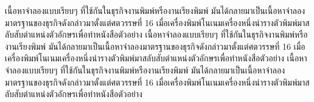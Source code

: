 \begin{thaiabstract}
\setlength{\parskip}{12pt}
\setlength{\parindent}{10mm}
\begin{spacing}{1.5}
\fontsize{16}{19.2}\selectfont
เนื้อหาจำลองแบบเรียบๆ ที่ใช้กันในธุรกิจงานพิมพ์หรืองานเรียงพิมพ์ มันได้กลายมาเป็นเนื้อหาจำลองมาตรฐานของธุรกิจดังกล่าวมาตั้งแต่ศตวรรษที่ 16 เมื่อเครื่องพิมพ์โนเนมเครื่องหนึ่งนำรางตัวพิมพ์มาสลับสับตำแหน่งตัวอักษรเพื่อทำหนังสือตัวอย่าง เนื้อหาจำลองแบบเรียบๆ ที่ใช้กันในธุรกิจงานพิมพ์หรืองานเรียงพิมพ์ มันได้กลายมาเป็นเนื้อหาจำลองมาตรฐานของธุรกิจดังกล่าวมาตั้งแต่ศตวรรษที่ 16 เมื่อเครื่องพิมพ์โนเนมเครื่องหนึ่งนำรางตัวพิมพ์มาสลับสับตำแหน่งตัวอักษรเพื่อทำหนังสือตัวอย่าง เนื้อหาจำลองแบบเรียบๆ ที่ใช้กันในธุรกิจงานพิมพ์หรืองานเรียงพิมพ์ มันได้กลายมาเป็นเนื้อหาจำลองมาตรฐานของธุรกิจดังกล่าวมาตั้งแต่ศตวรรษที่ 16 เมื่อเครื่องพิมพ์โนเนมเครื่องหนึ่งนำรางตัวพิมพ์มาสลับสับตำแหน่งตัวอักษรเพื่อทำหนังสือตัวอย่าง
\normalsize
\end{spacing}
\end{thaiabstract}
